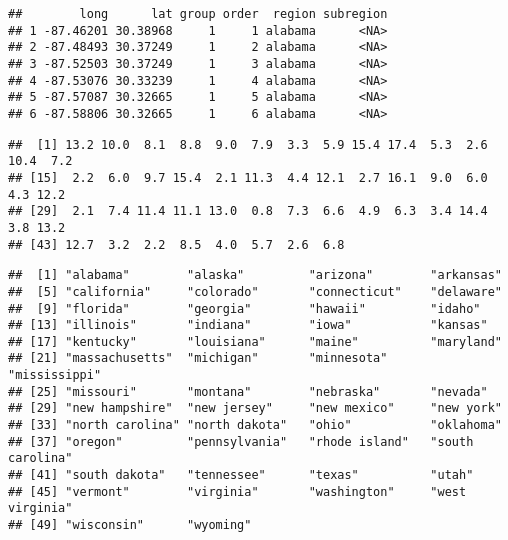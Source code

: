 \documentclass[]{article}
\newenvironment{Shaded}{\begin{snugshade}}{\end{snugshade}}
\newcommand{\NormalTok}[1]{#1}
\newcommand{\OperatorTok}[1]{\textcolor[rgb]{0.81,0.36,0.00}{\textbf{#1}}}
\begin{document}
\begin{verbatim}
##        long      lat group order  region subregion
## 1 -87.46201 30.38968     1     1 alabama      <NA>
## 2 -87.48493 30.37249     1     2 alabama      <NA>
## 3 -87.52503 30.37249     1     3 alabama      <NA>
## 4 -87.53076 30.33239     1     4 alabama      <NA>
## 5 -87.57087 30.32665     1     5 alabama      <NA>
## 6 -87.58806 30.32665     1     6 alabama      <NA>
\end{verbatim}

\begin{Shaded}
\end{Shaded}

\begin{verbatim}
##  [1] 13.2 10.0  8.1  8.8  9.0  7.9  3.3  5.9 15.4 17.4  5.3  2.6 10.4  7.2
## [15]  2.2  6.0  9.7 15.4  2.1 11.3  4.4 12.1  2.7 16.1  9.0  6.0  4.3 12.2
## [29]  2.1  7.4 11.4 11.1 13.0  0.8  7.3  6.6  4.9  6.3  3.4 14.4  3.8 13.2
## [43] 12.7  3.2  2.2  8.5  4.0  5.7  2.6  6.8
\end{verbatim}

\begin{Shaded}
\end{Shaded}

\begin{verbatim}
##  [1] "alabama"        "alaska"         "arizona"        "arkansas"      
##  [5] "california"     "colorado"       "connecticut"    "delaware"      
##  [9] "florida"        "georgia"        "hawaii"         "idaho"         
## [13] "illinois"       "indiana"        "iowa"           "kansas"        
## [17] "kentucky"       "louisiana"      "maine"          "maryland"      
## [21] "massachusetts"  "michigan"       "minnesota"      "mississippi"   
## [25] "missouri"       "montana"        "nebraska"       "nevada"        
## [29] "new hampshire"  "new jersey"     "new mexico"     "new york"      
## [33] "north carolina" "north dakota"   "ohio"           "oklahoma"      
## [37] "oregon"         "pennsylvania"   "rhode island"   "south carolina"
## [41] "south dakota"   "tennessee"      "texas"          "utah"          
## [45] "vermont"        "virginia"       "washington"     "west virginia" 
## [49] "wisconsin"      "wyoming"
\end{verbatim}
\end{document}
